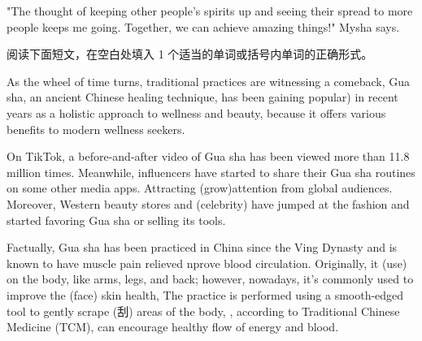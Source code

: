 \documentclass{英语试卷}
\begin{document}
\par "The thought of keeping other people's spirits up and seeing their  spread to more people keeps me going. Together, we can achieve amazing things!" Mysha says.\par
{}
\par 阅读下面短文，在空白处填入 1 个适当的单词或括号内单词的正确形式。\par
\par As the wheel of time turns, traditional practices are witnessing a comeback, Gua sha, an ancient Chinese healing technique, has been gaining \blanknum{} popular) in recent years as a holistic approach to wellness and beauty, because it offers various benefits to modern wellness seekers.\par
\par On TikTok, a before-and-after video of Gua sha has been viewed more than 11.8 million times. Meanwhile, influencers have started to share their Gua sha routines on some other media apps. Attracting  (grow)attention from global audiences. Moreover, Western beauty stores and  (celebrity) have jumped at the fashion and started favoring Gua sha or selling its tools.\par
\par Factually, Gua sha has been practiced in China since the Ving Dynasty and is known to have muscle pain relieved  nprove blood circulation. Originally, it  (use) on the body, like arms, legs, and back; however, nowadays, it's commonly used to improve the  (face) skin health, The practice is performed using a smooth-edged tool to gently scrape (刮) areas of the body, , according to Traditional Chinese Medicine (TCM), can encourage  healthy flow of energy and blood.\par
\end{document}
